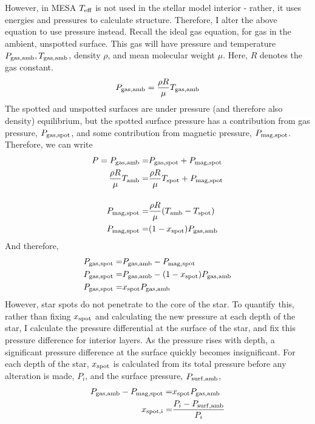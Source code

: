 However, in MESA $T_{\rm eff}$ is not used in the stellar model interior - rather, it uses energies and pressures to calculate structure. Therefore, I alter the above equation to use pressure instead.
Recall the ideal gas equation, for gas in the ambient, unspotted surface. This gas will have pressure and temperature $P_{\rm gas, amb}, T_{\rm gas, amb}$, density $\rho$, and mean molecular weight $\mu$. Here, $R$ denotes the gas constant.
\begin{equation}
    P_{\rm gas, amb} = \frac{\rho R}{\mu} T_{\rm gas, amb}
\end{equation}
The spotted and unspotted surfaces are under pressure (and therefore also density) equilibrium, but the spotted surface pressure has a contribution from gas pressure, $P_{\rm gas, spot}$, and some contribution from magnetic pressure, $P_{\rm mag, spot}$. Therefore, we can write
\begin{align}
    P = P_{\rm gas, amb} =& P_{\rm gas, spot} + P_{\rm mag, spot} \\
    \frac{\rho R}{\mu} T_{\rm amb} =& \frac{\rho R}{\mu} T_{\rm spot} + P_{\rm mag, spot} \\[12pt]
    P_{\rm mag, spot} =& \frac{\rho R}{\mu} (T_{\rm amb} - T_{\rm spot}) \\
    P_{\rm mag, spot} =& (1-x_{\rm spot}) P_{\rm gas, amb} \\
\end{align}
And therefore,
\begin{align}
    P_{\rm gas, spot} =& P_{\rm gas, amb} - P_{\rm mag, spot}\\
    P_{\rm gas, spot} =& P_{\rm gas, amb} - (1-x_{\rm spot}) P_{\rm gas, amb} \\
    P_{\rm gas, spot} =& x_{\rm spot} P_{\rm gas, amb}
\end{align}
However, star spots do not penetrate to the core of the star. To quantify this, rather than fixing $x_{\rm spot}$ and calculating the new pressure at each depth of the star, I calculate the pressure differential at the surface of the star, and fix this pressure difference for interior layers. As the pressure rises with depth, a significant pressure difference at the surface quickly becomes insignificant. For each depth of the star, $x_{\rm spot}$ is calculated from its total pressure before any alteration is made, $P_i$, and the surface pressure, $P_{\rm surf, amb}$,
\begin{align}
    P_{\rm gas, amb} - P_{\rm mag, spot} =& x_{\rm spot} P_{\rm gas, amb} \\
    x_{\rm spot, i} =& \frac{P_i - P_{\rm surf, amb}}{P_i}
\end{align}
